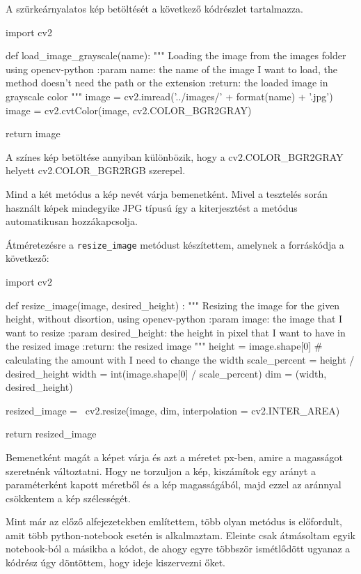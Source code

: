 A szürkeárnyalatos kép betöltését a következő kódrészlet tartalmazza.
\begin{python}
import cv2

def load_image_grayscale(name):
    """
    Loading the image from the images folder using opencv-python
    :param name: the name of the image I want to load,
        the method doesn't need the path or the extension
    :return: the loaded image in grayscale color
    """
    image = cv2.imread('../images/' + format(name) + '.jpg')
    image = cv2.cvtColor(image, cv2.COLOR_BGR2GRAY)

    return image
\end{python}
A színes kép betöltése annyiban különbözik, hogy a cv2.COLOR\_BGR2GRAY helyett cv2.COLOR\_BGR2RGB szerepel.

Mind a két metódus a kép nevét várja bemenetként. Mivel a tesztelés során használt képek mindegyike JPG típusú így a kiterjesztést a metódus automatikusan hozzákapcsolja.


Átméretezésre a \texttt{resize\_image} metódust készítettem, amelynek a forráskódja a következő:
\begin{python}
import cv2

def resize_image(image, desired_height) :
    """
    Resizing the image for the given height,
    without disortion, using opencv-python
    :param image: the image that I want to resize
    :param desired_height: the height in pixel that
        I want to have in the resized image
    :return: the resized image
    """
    height = image.shape[0]
    # calculating the amount with I need to change the width
    scale_percent = height / desired_height
    width = int(image.shape[0] / scale_percent)
    dim = (width, desired_height)

    resized_image = \
        cv2.resize(image, dim, interpolation = cv2.INTER_AREA)

    return resized_image
\end{python}
Bemenetként magát a képet várja és azt a méretet px-ben, amire a magasságot szeretnénk változtatni. Hogy ne torzuljon a kép, kiszámítok egy arányt a paraméterként kapott méretből és a kép magasságából, majd ezzel az aránnyal csökkentem a kép szélességét.


Mint már az előző alfejezetekben említettem, több olyan metódus is előfordult, amit több python-notebook esetén is alkalmaztam. Eleinte csak átmásoltam egyik notebook-ból a másikba a kódot, de ahogy egyre többször ismétlődött ugyanaz a kódrész úgy döntöttem, hogy ideje kiszervezni őket.

